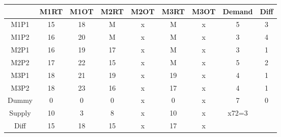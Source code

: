 \documentclass{article}%
\begin{document}
\begin{tabular}{c|c|c|cccccc}
    & M1RT & M1OT & M2RT & M2OT & M3RT & M3OT & Demand               & Diff                 \\
    \midrule
    M1P1   & 15   & 18   & M    & x    & M    & x    & 5                    & 3                    \\
    M1P2   & 16   & 20   & M    & x    & M    & x    & 3                    & 4                    \\
    M2P1   & 16   & 19   & 17   & x    & M    & x    & 3                    & 1                    \\
    M2P2   & 17   & 22   & 15   & x    & M    & x    & 5                    & 2                    \\
    M3P1   & 18   & 21   & 19   & x    & 19   & x    & 4                    & 1                    \\
    M3P2   & 18   & 23   & 16   & x    & 17   & x    & 4                    & 1                    \\
    \cmidrule{2-9}
    Dummy  & 0    & 0    & 0    & x    & 0    & x    & 7                    & 0                    \\
    \cmidrule{2-9}
    Supply & 10   & 3    & 8    & x    & 10   & x    & x72=3                &                      \\
    Diff   & 15   & 18   & 15   & x    & 17   & x    &                      &                      \\
\end{tabular}
\newline
\newline
\end{document}
